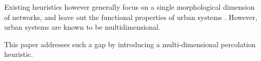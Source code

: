 \documentclass{jimis-en}
\begin{document}



Existing heuristics however generally focus on a single morphological dimension of networks, and leave out the functional properties of urban systems \citep{burger2012form}. However, urban systems are known to be multidimensional.

This paper addresses such a gap by introducing a multi-dimensional percolation heuristic.








\end{document}
